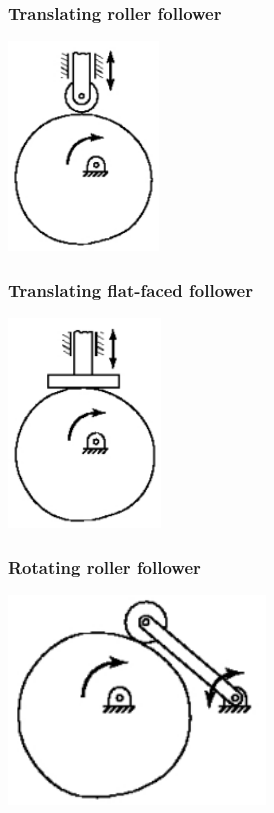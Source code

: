 \documentclass[11pt]{article}
\begin{document}
\subsubsection{Translating roller follower}
\label{sec:org5557a94}
\begin{center}
\includegraphics[height=15em]{./images/translating-roller-follower.png}
\end{center}
\subsubsection{Translating flat-faced follower}
\label{sec:org5515a06}
\begin{center}
\includegraphics[height=15em]{./images/translating-flat-faced-follower.png}
\end{center}
\subsubsection{Rotating roller follower}
\label{sec:org3a54ffb}
\begin{center}
\includegraphics[height=15em]{./images/rotating-roller-follower.png}
\end{center}
\end{document}
